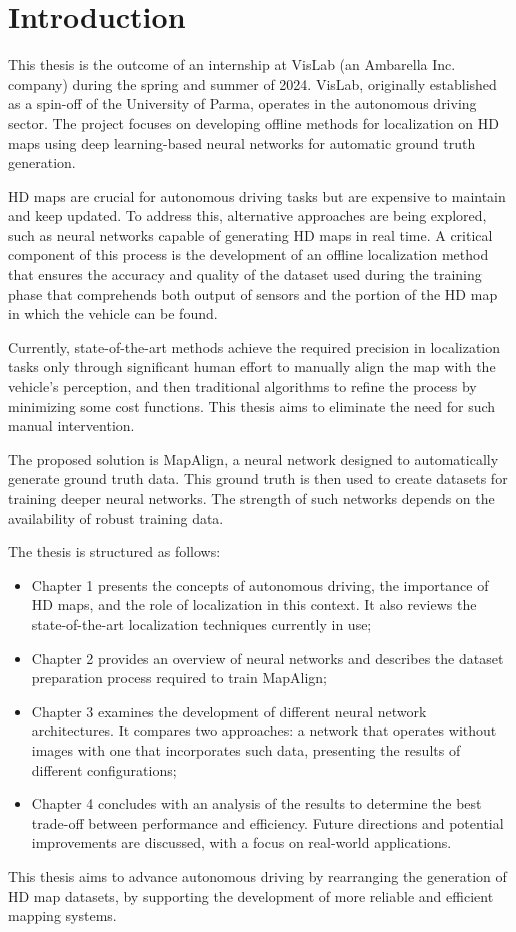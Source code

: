 \chapter*{Introduction}

This thesis is the outcome of an internship at VisLab (an Ambarella Inc. company) during the spring and summer of 2024. VisLab, originally established as a spin-off of the University of Parma, operates in the autonomous driving sector. The project focuses on developing offline methods for localization on HD maps using deep learning-based neural networks for automatic ground truth generation.

HD maps are crucial for autonomous driving tasks but are expensive to maintain and keep updated. To address this, alternative approaches are being explored, such as neural networks capable of generating HD maps in real time. A critical component of this process is the development of an offline localization method that ensures the accuracy and quality of the dataset used during the training phase that comprehends both output of sensors and the portion of the HD map in which the vehicle can be found.

Currently, state-of-the-art methods achieve the required precision in localization tasks only through significant human effort to manually align the map with the vehicle’s perception, and then traditional algorithms to refine the process by minimizing some cost functions. This thesis aims to eliminate the need for such manual intervention.

The proposed solution is MapAlign, a neural network designed to automatically generate ground truth data. This ground truth is then used to create datasets for training deeper neural networks. The strength of such networks depends on the availability of robust training data.

The thesis is structured as follows:
\begin{itemize}
    \item Chapter 1 presents the concepts of autonomous driving, the importance of HD maps, and the role of localization in this context. It also reviews the state-of-the-art localization techniques currently in use;
    \item Chapter 2 provides an overview of neural networks and describes the dataset preparation process required to train MapAlign;
    \item Chapter 3 examines the development of different neural network architectures. It compares two approaches: a network that operates without images with one that incorporates such data, presenting the results of different configurations;
    \item Chapter 4 concludes with an analysis of the results to determine the best trade-off between performance and efficiency. Future directions and potential improvements are discussed, with a focus on real-world applications.

\end{itemize}

This thesis aims to advance autonomous driving by rearranging the generation of HD map datasets, by supporting the development of more reliable and efficient mapping systems.
